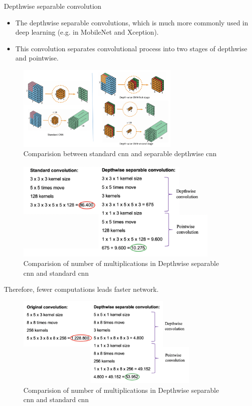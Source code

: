 \begin{vbframe}{Depthwise separable convolution}
   \begin{itemize}
     \item The depthwise separable convolutions, which is much more commonly used in deep learning (e.g. in MobileNet and Xception).
     \item This convolution separates convolutional process into two stages of depthwise and pointwise.
   \end{itemize}

 
\begin{figure}
\centering
\includegraphics[width=8cm]{plots/05_conv_variations/separable/Depthwise.png}
\caption{Comparision between standard cnn and separable depthwise cnn}
\end{figure}
     
     
\begin{figure}
\centering
\includegraphics[width=10cm]{plots/05_conv_variations/separable/example-depthwise2.png}
\caption{Comparision of number of multiplications in Depthwise separable cnn and standard cnn}
\end{figure}
     
Therefore, fewer computations leads faster network.
     
\begin{figure}
\centering
\includegraphics[width=9cm]{plots/05_conv_variations/separable/example-depthwise1.png}
\caption{Comparision of number of multiplications in Depthwise separable cnn and standard cnn}
\end{figure}
     
\end{vbframe}

